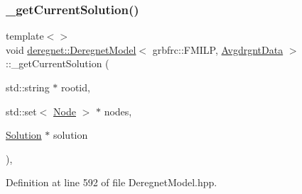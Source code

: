 \subsubsection{\texorpdfstring{\+\_\+get\+Current\+Solution()}{\_getCurrentSolution()}\hspace{0.1cm}{\footnotesize\ttfamily [3/3]}}
{\footnotesize\ttfamily template$<$$>$ \\
void \hyperlink{classderegnet_1_1DeregnetModel}{deregnet\+::\+Deregnet\+Model}$<$ grbfrc\+::\+F\+M\+I\+LP, \hyperlink{classderegnet_1_1AvgdrgntData}{Avgdrgnt\+Data} $>$\+::\+\_\+get\+Current\+Solution (\begin{DoxyParamCaption}\item[{std\+::string $\ast$}]{rootid,  }\item[{std\+::set$<$ \hyperlink{namespacederegnet_a744bad34f2de9856d36715a445f027f3}{Node} $>$ $\ast$}]{nodes,  }\item[{\hyperlink{structderegnet_1_1Solution}{Solution} $\ast$}]{solution }\end{DoxyParamCaption})\hspace{0.3cm}{\ttfamily [inline]}, {\ttfamily [private]}}



Definition at line 592 of file Deregnet\+Model.\+hpp.


